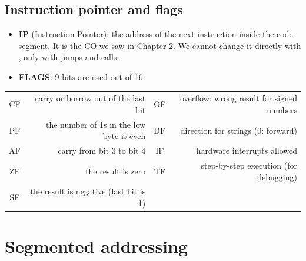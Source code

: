 \subsection{Instruction pointer and flags}
\begin{itemize}
    \item \textbf{IP} (Instruction Pointer): the address of the next instruction inside the code segment. It is the
          CO we saw in Chapter 2. We cannot change it directly with , only with jumps and calls.
    \item \textbf{FLAGS}: 9 bits are used out of 16:
\end{itemize}

\begin{center}
\end{center}

\begin{center}
\small
\begin{tabularx}{\linewidth}{|c|R||c|R|}
    \hline
     &  &  &  \\ \hline
    CF & carry or borrow out of the last bit & OF & overflow: wrong result for signed numbers \\ \hline
    PF & the number of 1s in the low byte is even & DF & direction for strings (0: forward) \\ \hline
    AF & carry from bit 3 to bit 4 & IF & hardware interrupts allowed \\ \hline
    ZF & the result is zero & TF & step-by-step execution (for debugging) \\ \hline
    SF & the result is negative (last bit is 1) & & \\ \hline
\end{tabularx}
\end{center}

\section{Segmented addressing}

